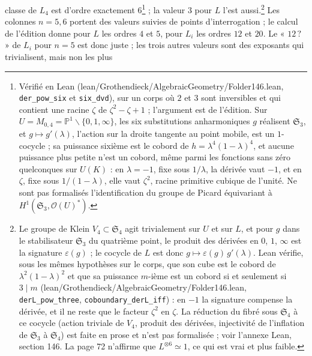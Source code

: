 \documentclass[11pt,a4paper]{article}
\begin{document}
classe de $L_4$ est d'ordre exactement $6$\footnote{Vérifié en Lean
(lean/Grothendieck/AlgebraicGeometry/Folder146.lean, \texttt{der\_pow\_six} et
\texttt{six\_dvd}), sur un corps où $2$ et $3$ sont inversibles et qui contient
une racine $\zeta$ de $\zeta^2 - \zeta + 1$ ; l'argument est de l'édition. Sur
$U = M_{0,4} = \mathbb{P}^1 \smallsetminus \{0, 1, \infty\}$, les six
substitutions anharmoniques $g$ réalisent $\mathfrak{S}_3$, et $g \mapsto
g'(\lambda)$, l'action sur la droite tangente au point mobile, est un
$1$-cocycle ; sa puissance sixième est le cobord de $h = \lambda^4(1 -
\lambda)^4$, et aucune puissance plus petite n'est un cobord, même parmi les
fonctions sans zéro quelconques sur $U(K)$ : en $\lambda = -1$, fixe sous
$1/\lambda$, la dérivée vaut $-1$, et en $\zeta$, fixe sous $1/(1 - \lambda)$,
elle vaut $\zeta^2$, racine primitive cubique de l'unité. Ne sont pas
formalisés l'identification du groupe de Picard équivariant à
$H^1(\mathfrak{S}_3, \mathcal{O}(U)^{*})$.} ; la valeur $3$ pour $L$ l'est aussi.\footnote{Le groupe de Klein
$V_4 \subset \mathfrak{S}_4$ agit trivialement sur $U$ et sur $L$, et pour $g$
dans le stabilisateur $\mathfrak{S}_3$ du quatrième point, le produit des
dérivées en $0$, $1$, $\infty$ est la signature $\varepsilon(g)$ ; le
cocycle de $L$ est donc $g \mapsto \varepsilon(g)\,g'(\lambda)$. Lean
vérifie, sous les mêmes hypothèses sur le corps, que son cube est le cobord de
$\lambda^2(1-\lambda)^2$ et que sa puissance $m$-ième est un cobord si et
seulement si $3 \mid m$ (lean/Grothendieck/AlgebraicGeometry/Folder146.lean,
\texttt{derL\_pow\_three}, \texttt{coboundary\_derL\_iff}) : en $-1$ la
signature compense la dérivée, et il ne reste que le facteur $\zeta^2$ en
$\zeta$. La réduction du fibré sous $\mathfrak{S}_4$ à ce cocycle (action
triviale de $V_4$, produit des dérivées, injectivité de l'inflation de
$\mathfrak{S}_3$ à $\mathfrak{S}_4$) est faite en prose et n'est pas
formalisée ; voir l'annexe Lean, section 146. La page 72 n'affirme que
$L^{\otimes 6} \simeq 1$, ce qui est vrai et plus faible.} Les colonnes
$n = 5, 6$ portent des valeurs suivies de points d'interrogation ; le calcul de
l'édition donne pour $L$ les ordres $4$ et $5$, pour $L_i$ les ordres $12$ et
$20$. Le « $12\,?$ » de $L_i$ pour $n = 5$ est donc juste ; les trois autres
valeurs sont des exposants qui trivialisent, mais non les plus
\end{document}
